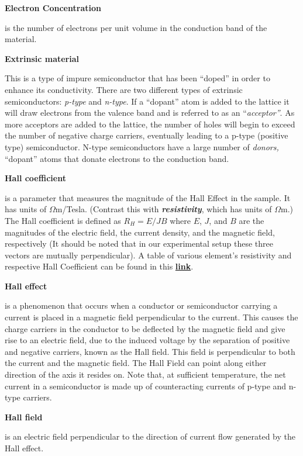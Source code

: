 \documentclass{../lab}
\begin{document}
\textbf{Electron Concentration}

is the number of electrons per unit volume in the conduction band of the material.

\textbf{Extrinsic material}

This is a type of impure semiconductor that has been ``doped'' in order to enhance its conductivity. There are two different types of extrinsic semiconductors: \emph{p-type} and \emph{n-type}. If a ``dopant'' atom is added to the lattice it will draw electrons from the valence band and is referred to as an ``\emph{acceptor''}. As more acceptors are added to the lattice, the number of holes will begin to exceed the number of negative charge carriers, eventually leading to a p-type (positive type) semiconductor. N-type semiconductors have a large number of\emph{ donors,} ``dopant'' atoms that donate electrons to the conduction band.

\textbf{Hall coefficient}

is a parameter that measures the magnitude of the Hall Effect in the sample. It has units of $\Omega$m/Tesla. (Contrast this with \emph{\textbf{resistivity}}, which has units of $\Omega$m.) The Hall coefficient is defined as $R_{H} = E/JB $  where $E$, $J$, and $B$ are the magnitudes of the electric field, the current density, and the magnetic field, respectively (It should be noted that in our experimental setup these three vectors are mutually perpendicular). A table of various element's resistivity and respective Hall Coefficient can be found in this \href{https://berkeley-physics111b.github.io/assets/pdf/oldwebsitestructure/SHE/tableforRH.png}{\textbf{link}}.

\textbf{Hall effect}

is a phenomenon that occurs when a conductor or semiconductor carrying a current is placed in a magnetic field perpendicular to the current. This causes the charge carriers in the conductor to be deflected by the magnetic field and give rise to an electric field, due to the induced voltage by the separation of positive and negative carriers, known as the Hall field. This field is perpendicular to both the current and the magnetic field. The Hall Field can point along either direction of the axis it resides on. Note that, at sufficient temperature, the net current in a semiconductor is made up of counteracting currents of p-type and n-type carriers.

\textbf{Hall field}

is an electric field perpendicular to the direction of current flow generated by the Hall effect.
\end{document}

